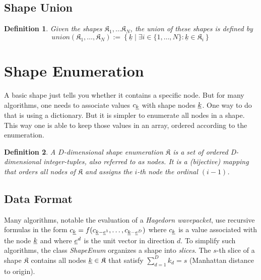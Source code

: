 \documentclass{article}
\def\classname#1{\textit{#1}}
\newtheorem{definition}{Definition}
\begin{document}
\subsection{Shape Union}

\begin{definition}
  Given the shapes \( \mathfrak{K}_1, \ldots \mathfrak{K}_N \),
  the union of these shapes is defined by
  \begin{equation}
    union(\mathfrak{K}_1,\ldots,\mathfrak{K}_N) := \left\{ 
      \underline{k} \mid \exists i \in \{1, \ldots, N \} \colon \underline{k} \in \mathfrak{K}_i\right\}
  \end{equation}
\end{definition}

\section{Shape Enumeration}

A basic shape just tells you whether it contains a specific node. But
for many algorithms, one needs to associate values \(c_{\underline{k}}\) with shape
nodes \(\underline{k}\). One way to do that is using a dictionary. But it is simpler to
enumerate all nodes in a shape.  This way one is able to keep those
values in an array, ordered according to the enumeration.

\begin{definition}
  A \( D \)-dimensional
  shape enumeration \( \mathfrak{K} \)
  is a set of ordered D-dimensional integer-tuples, also referred to
  as \emph{nodes}. It is a (bijective) mapping that orders all nodes
  of \( \mathfrak{K} \)
  and assigns the \(i\)-th node the ordinal \( (i-1) \).
\end{definition}

\subsection{Data Format}
Many algorithms, notable the evaluation of a \emph{Hagedorn wavepacket},
use recursive formulas in the form
\( c_{\underline{k}} = f(c_{\underline{k}-\underline{e}^1}, \ldots,
c_{\underline{k}-\underline{e}^D}) \)
where \( c_{\underline{k}} \)
is a value associated with the node \( \underline{k} \)
and where \( \underline{e}^d \)
is the unit vector in direction \( d \).
To simplify such algorithms, the class \classname{ShapeEnum} organizes a shape
into \emph{slices}.  The \( s \)-th
slice of a shape \( \mathfrak{K} \)
contains all nodes \( \underline{k} \in \mathfrak{K} \)
that satisfy \( \sum_{d=1}^{D} k_d = s \) (Manhattan distance to origin).
\end{document}
